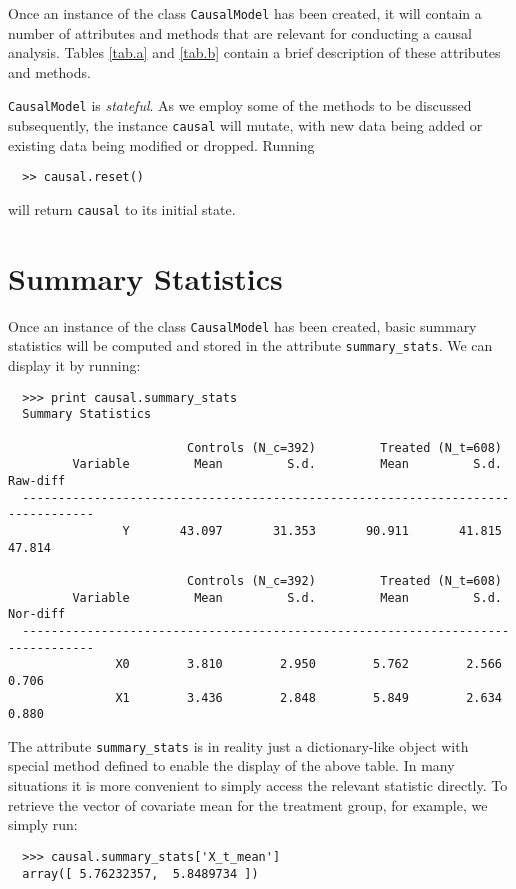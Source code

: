 \documentclass[12pt]{article}
\theoremstyle{definition}
\theoremstyle{definition}
\theoremstyle{definition}
\theoremstyle{remark}
\begin{document}
Once an instance of the class \texttt{CausalModel} has been created, it will contain a number of attributes and methods that are relevant for conducting a causal analysis. Tables \ref{tab.a} and \ref{tab.b} contain a brief description of these attributes and methods.

\texttt{CausalModel} is \textit{stateful}. As we employ some of the methods to be discussed subsequently, the instance \texttt{causal} will mutate, with new data being added or existing data being modified or dropped. Running
\begin{verbatim}
  >> causal.reset()
\end{verbatim}
will return \texttt{causal} to its initial state.

\section*{Summary Statistics}

Once an instance of the class \texttt{CausalModel} has been created, basic summary statistics will be computed and stored in the attribute \texttt{summary\_stats}. We can display it by running:
\begin{verbatim}
  >>> print causal.summary_stats
  Summary Statistics
  
                         Controls (N_c=392)         Treated (N_t=608)             
         Variable         Mean         S.d.         Mean         S.d.     Raw-diff
  --------------------------------------------------------------------------------
                Y       43.097       31.353       90.911       41.815       47.814
  
                         Controls (N_c=392)         Treated (N_t=608)             
         Variable         Mean         S.d.         Mean         S.d.     Nor-diff
  --------------------------------------------------------------------------------
               X0        3.810        2.950        5.762        2.566        0.706
               X1        3.436        2.848        5.849        2.634        0.880
\end{verbatim}

The attribute \texttt{summary\_stats} is in reality just a dictionary-like object with special method defined to enable the display of the above table. In many situations it is more convenient to simply access the relevant statistic directly. To retrieve the vector of covariate mean for the treatment group, for example, we simply run:
\begin{verbatim}
  >>> causal.summary_stats['X_t_mean']
  array([ 5.76232357,  5.8489734 ])
\end{verbatim}
\end{document}

